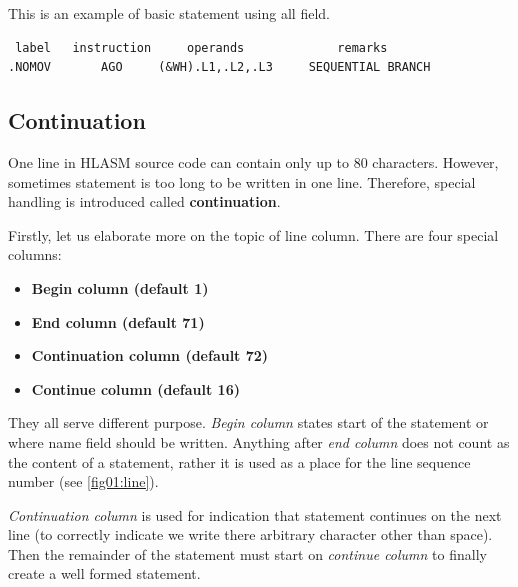 This is an example of basic statement using all field.
\begin{verbatim}
 label   instruction     operands             remarks
.NOMOV       AGO     (&WH).L1,.L2,.L3     SEQUENTIAL BRANCH
\end{verbatim}

\subsection{Continuation}

One line in HLASM source code can contain only up to 80 characters. However, sometimes statement is too long to be written in one line. Therefore, special handling is introduced called \textbf{continuation}.

Firstly, let us elaborate more on the topic of line column. There are four special columns:
\begin{itemize}
	\item \textbf{Begin column (default 1)}
	
	\item \textbf{End column (default 71)}
	
	\item \textbf{Continuation column (default 72)}
	
	\item \textbf{Continue column (default 16)}
\end{itemize}
They all serve different purpose. \textit{Begin column} states start of the statement or where name field should be written. Anything after \textit{end column} does not count as the content of a statement, rather it is used as a place for the line sequence number (see \ref{fig01:line}). 

\textit{Continuation column} is used for indication that statement continues on the next line (to correctly indicate we write there arbitrary character other than space). Then the remainder of the statement must start on \textit{continue column} to finally create a well formed statement.

